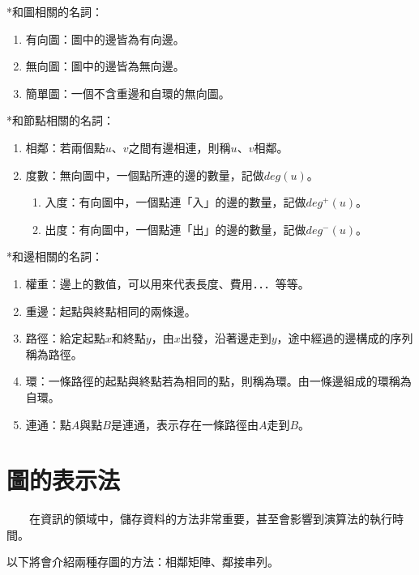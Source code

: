 \hspace*{\fill}

*和圖相關的名詞：
\begin{enumerate}
\item 有向圖：圖中的邊皆為有向邊。
\item 無向圖：圖中的邊皆為無向邊。
\item 簡單圖：一個不含重邊和自環的無向圖。
\end{enumerate}

\hspace*{\fill}

*和節點相關的名詞：
\begin{enumerate}
    \item 相鄰：若兩個點$u$、$v$之間有邊相連，則稱$u$、$v$相鄰。
    \item 度數：無向圖中，一個點所連的邊的數量，記做$deg(u)$。
    \begin{enumerate}
        \item 入度：有向圖中，一個點連「入」的邊的數量，記做$deg^+(u)$。
        \item 出度：有向圖中，一個點連「出」的邊的數量，記做$deg^-(u)$。
    \end{enumerate}
\end{enumerate}

\hspace*{\fill}

*和邊相關的名詞：
\begin{enumerate}
\item 權重：邊上的數值，可以用來代表長度、費用．．．等等。
\item 重邊：起點與終點相同的兩條邊。
\item 路徑：給定起點$x$和終點$y$，由$x$出發，沿著邊走到$y$，途中經過的邊構成的序列稱為路徑。
\item 環：一條路徑的起點與終點若為相同的點，則稱為環。由一條邊組成的環稱為自環。
\item 連通：點$A$與點$B$是連通，表示存在一條路徑由$A$走到$B$。
\end{enumerate}

\section{圖的表示法}

　　在資訊的領域中，儲存資料的方法非常重要，甚至會影響到演算法的執行時間。
\hspace*{\fill}

以下將會介紹兩種存圖的方法：相鄰矩陣、鄰接串列。

